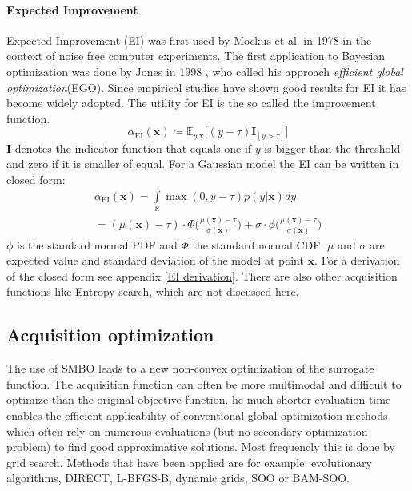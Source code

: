 \documentclass[english]{article}
\newcommand{\EI}{\operatorname{EI}}
\newcommand{\x}{\mathbf{x}}
\newcommand{\E}{\mathbb{E}}
\begin{document}
\paragraph{Expected Improvement}
Expected Improvement (EI) was first used by Mockus et al. in 1978 \cite{mockus_application_1978} in the context of noise free computer experiments. The first application to Bayesian optimization was done by Jones in 1998 \cite{jones_efficient_1998}, who called his approach \textit{efficient global optimization}(EGO). Since empirical studies have shown good results for EI it has become widely adopted. The utility for EI is the so called the improvement function.
\begin{equation}
  \alpha_{\EI}(\x) \coloneqq \E_{y|\x}\big[(y - \tau)\mathbf{I}_{[y > \tau]}\big]
\end{equation}
$\mathbf{I}$ denotes the indicator function that equals one if $y$ is bigger than the threshold and zero if it is smaller of equal. For a Gaussian model the EI can be written in closed form:
\begin{equation}
  \begin{split}
    \alpha_{\EI}(\x) = \int\limits_{\mathbb{R}} \max(0, y-\tau)p(y|\x)dy
    \\
    = (\mu(\x) - \tau) \cdot \Phi \bigg(\frac{\mu(\x)-\tau}{\sigma(\x)}\bigg) + \sigma \cdot \phi \bigg(\frac{\mu(\x)-\tau}{\sigma(\x)}\bigg)
  \end{split}
\end{equation}
$\phi$ is the standard normal PDF and $\Phi$ the standard normal CDF. $\mu$ and $\sigma$ are expected value and standard deviation of the model at point $\x$.
For a derivation of the closed form see appendix \ref{EI derivation}.
There are also other acquisition functions like Entropy search, which are not discussed here.

\subsection*{Acquisition optimization}
The use of SMBO leads to a new non-convex optimization of the surrogate function. The acquisition function can often be more multimodal and difficult to optimize than the original objective function. he much shorter evaluation time enables the efficient applicability of conventional global optimization methods which often rely on numerous evaluations (but no secondary optimization problem) to find good approximative solutions.
Most frequencly this is done by grid search. Methods that have been applied are for example: evolutionary algorithms, DIRECT, L-BFGS-B, dynamic grids, SOO or BAM-SOO.
\end{document}
